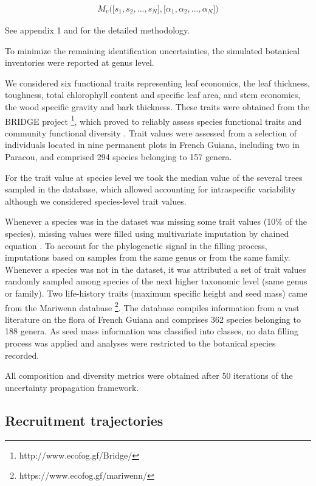 \documentclass[fleqn,10pt]{ArtEcoFoG} %
\begin{document}
\begin{align}
M_v\Big(\big[s_1, s_2,..., s_N\big],\big[\alpha_1, \alpha_2,..., \alpha_N\big]\Big) \nonumber
\end{align}

See appendix 1 and \citet{Aubry-Kientz2013} for the detailed
methodology.

To minimize the remaining identification uncertainties, the simulated
botanical inventories were reported at genus level.

We considered six functional traits representing leaf economics, the
leaf thickness, toughness, total chlorophyll content and specific leaf
area, and stem economics, the wood specific gravity and bark thickness.
These traits were obtained from the BRIDGE project \footnote{http://www.ecofog.gf/Bridge/},
which proved to reliably assess species functional traits and community
functional diversity \citep{Paine2015}. Trait values were assessed from
a selection of individuals located in nine permanent plots in French
Guiana, including two in Paracou, and comprised 294 species belonging to
157 genera.

\color{red} For the trait value at species level we took the median
value of the several trees sampled in the database, which allowed
accounting for intraspecific variability although we considered
species-level trait values. \color{black}

Whenever a species was in the dataset was missing some trait values
(10\% of the species), missing values were filled using multivariate
imputation by chained equation \citep{Mice2011}. To account for the
phylogenetic signal in the filling process, imputations based on samples
from the same genus or from the same family. Whenever a species was not
in the dataset, it was attributed a set of trait values randomly sampled
among species of the next higher taxonomic level (same genus or family).
Two life-history traits (maximum specific height and seed mass) came
from the Mariwenn database \footnote{https://www.ecofog.gf/mariwenn/}.
The database compiles information from a vast literature on the flora of
French Guiana \citep{Ollivier2007} and comprises 362 species belonging
to 188 genera. As seed mass information was classified into classes, no
data filling process was applied and analyses were restricted to the
botanical species recorded.

All composition and diversity metrics were obtained after 50 iterations
of the uncertainty propagation framework.

\subsection{Recruitment trajectories}\label{recruitment-trajectories}
\end{document}
